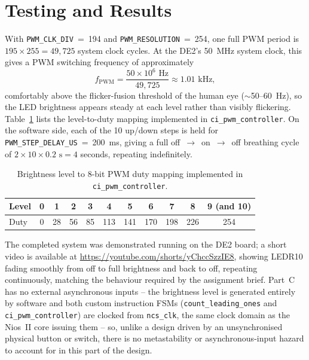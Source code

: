 \documentclass[
    12pt,
    a4paper
]{report}
\begin{document}
\section{Testing and Results}

With \texttt{PWM\_CLK\_DIV}~=~194 and \texttt{PWM\_RESOLUTION}~=~254, one full PWM period is
$195 \times 255 = 49{,}725$ system clock cycles. At the DE2's 50~MHz system clock, this gives a PWM
switching frequency of approximately
\[
    f_{\text{PWM}} = \frac{50\times10^{6}\text{ Hz}}{49{,}725} \approx 1.01\text{ kHz},
\]
comfortably above the flicker-fusion threshold of the human eye ($\sim$50--60~Hz), so the LED
brightness appears steady at each level rather than visibly flickering. Table~\ref{tab:level-duty}
lists the level-to-duty mapping implemented in \texttt{ci\_pwm\_controller}. On the software side,
each of the 10 up/down steps is held for \texttt{PWM\_STEP\_DELAY\_US}~=~200~ms, giving a full
off~$\rightarrow$~on~$\rightarrow$~off breathing cycle of $2 \times 10 \times 0.2\text{ s} = 4$
seconds, repeating indefinitely.

\begin{table}[H]
    \centering
    \caption{Brightness level to 8-bit PWM duty mapping implemented in \texttt{ci\_pwm\_controller}.}
    \label{tab:level-duty}
    \begin{tabular}{lcccccccccc}
        \toprule
        Level & 0 & 1 & 2 & 3 & 4 & 5 & 6 & 7 & 8 & 9 (and 10) \\
        \midrule
        Duty & 0 & 28 & 56 & 85 & 113 & 141 & 170 & 198 & 226 & 254 \\
        \bottomrule
    \end{tabular}
\end{table}

The completed system was demonstrated running on the DE2 board; a short video is available at
\url{https://youtube.com/shorts/yChccSzzIE8}, showing LEDR10 fading smoothly from off to full
brightness and back to off, repeating continuously, matching the behaviour required by the
assignment brief. Part~C has no external asynchronous inputs -- the brightness level is generated
entirely by software and both custom instruction FSMs (\texttt{count\_leading\_ones} and
\texttt{ci\_pwm\_controller}) are clocked from \texttt{ncs\_clk}, the same clock domain as the
Nios~II core issuing them -- so, unlike a design driven by an unsynchronised physical button or
switch, there is no metastability or asynchronous-input hazard to account for in this part of the
design.
\end{document}
